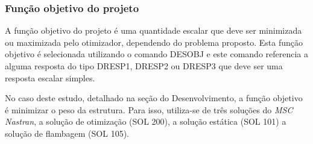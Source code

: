 \subsubsection{Função objetivo do projeto}
A função objetivo do projeto é uma quantidade escalar que deve ser minimizada ou maximizada pelo otimizador, dependendo do problema proposto. Esta função objetivo é selecionada utilizando o comando DESOBJ e este comando referencia a alguma resposta do tipo DRESP1, DRESP2 ou DRESP3 que deve ser uma resposta escalar simples.

No caso deste estudo, detalhado na seção do Desenvolvimento, a função objetivo é minimizar o peso da estrutura. Para isso, utiliza-se de três soluções do \emph{MSC Nastran}, a solução de otimização (SOL 200), a solução estática (SOL 101) a solução de flambagem (SOL 105).
